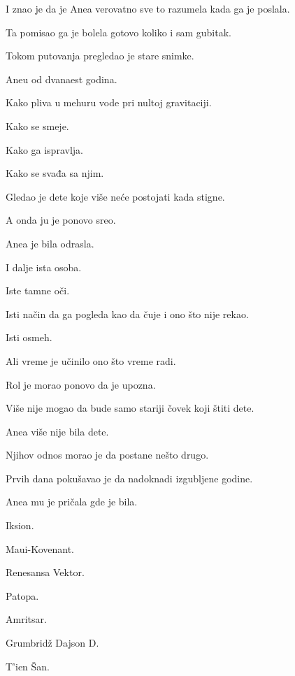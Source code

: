 \bigskip

I znao je da je Anea verovatno sve to razumela kada ga je poslala.

\bigskip

Ta pomisao ga je bolela gotovo koliko i sam gubitak.

\bigskip

Tokom putovanja pregledao je stare snimke.

Aneu od dvanaest godina.

Kako pliva u mehuru vode pri nultoj gravitaciji.

Kako se smeje.

Kako ga ispravlja.

Kako se svađa sa njim.

\bigskip

Gledao je dete koje više neće postojati kada stigne.

\bigskip

A onda ju je ponovo sreo.

\bigskip

Anea je bila odrasla.

I dalje ista osoba.

Iste tamne oči.

Isti način da ga pogleda kao da čuje i ono što nije rekao.

Isti osmeh.

\bigskip

Ali vreme je učinilo ono što vreme radi.

\bigskip

Rol je morao ponovo da je upozna.

\bigskip

Više nije mogao da bude samo stariji čovek koji štiti dete.

Anea više nije bila dete.

\bigskip

Njihov odnos morao je da postane nešto drugo.

\bigskip

Prvih dana pokušavao je da nadoknadi izgubljene godine.

Anea mu je pričala gde je bila.

Iksion.

Maui-Kovenant.

Renesansa Vektor.

Patopa.

Amritsar.

Grumbridž Dajson D.

T'ien Šan.

